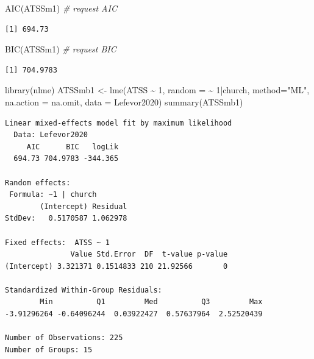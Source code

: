 \documentclass[
  english,
]{book}
\newenvironment{Shaded}{\begin{snugshade}}{\end{snugshade}}
\newcommand{\AttributeTok}[1]{\textcolor[rgb]{0.77,0.63,0.00}{#1}}
\newcommand{\CommentTok}[1]{\textcolor[rgb]{0.56,0.35,0.01}{\textit{#1}}}
\newcommand{\DecValTok}[1]{\textcolor[rgb]{0.00,0.00,0.81}{#1}}
\newcommand{\FunctionTok}[1]{\textcolor[rgb]{0.00,0.00,0.00}{#1}}
\newcommand{\NormalTok}[1]{#1}
\newcommand{\OtherTok}[1]{\textcolor[rgb]{0.56,0.35,0.01}{#1}}
\newcommand{\SpecialCharTok}[1]{\textcolor[rgb]{0.00,0.00,0.00}{#1}}
\newcommand{\StringTok}[1]{\textcolor[rgb]{0.31,0.60,0.02}{#1}}
\begin{document}
\begin{Shaded}
\begin{Highlighting}[]
\FunctionTok{AIC}\NormalTok{(ATSSm1) }\CommentTok{\# request AIC}
\end{Highlighting}
\end{Shaded}

\begin{verbatim}
[1] 694.73
\end{verbatim}

\begin{Shaded}
\begin{Highlighting}[]
\FunctionTok{BIC}\NormalTok{(ATSSm1) }\CommentTok{\# request BIC}
\end{Highlighting}
\end{Shaded}

\begin{verbatim}
[1] 704.9783
\end{verbatim}

\begin{Shaded}
\begin{Highlighting}[]
\FunctionTok{library}\NormalTok{(nlme)}
\NormalTok{ATSSmb1 }\OtherTok{\textless{}{-}} \FunctionTok{lme}\NormalTok{(ATSS }\SpecialCharTok{\textasciitilde{}} \DecValTok{1}\NormalTok{, }\AttributeTok{random =} \SpecialCharTok{\textasciitilde{}} \DecValTok{1}\SpecialCharTok{|}\NormalTok{church, }\AttributeTok{method=}\StringTok{"ML"}\NormalTok{, }\AttributeTok{na.action =}\NormalTok{ na.omit, }\AttributeTok{data =}\NormalTok{ Lefevor2020)}
\FunctionTok{summary}\NormalTok{(ATSSmb1)}
\end{Highlighting}
\end{Shaded}

\begin{verbatim}
Linear mixed-effects model fit by maximum likelihood
  Data: Lefevor2020 
     AIC      BIC   logLik
  694.73 704.9783 -344.365

Random effects:
 Formula: ~1 | church
        (Intercept) Residual
StdDev:   0.5170587 1.062978

Fixed effects:  ATSS ~ 1 
               Value Std.Error  DF  t-value p-value
(Intercept) 3.321371 0.1514833 210 21.92566       0

Standardized Within-Group Residuals:
        Min          Q1         Med          Q3         Max 
-3.91296264 -0.64096244  0.03922427  0.57637964  2.52520439 

Number of Observations: 225
Number of Groups: 15 
\end{verbatim}
\end{document}
